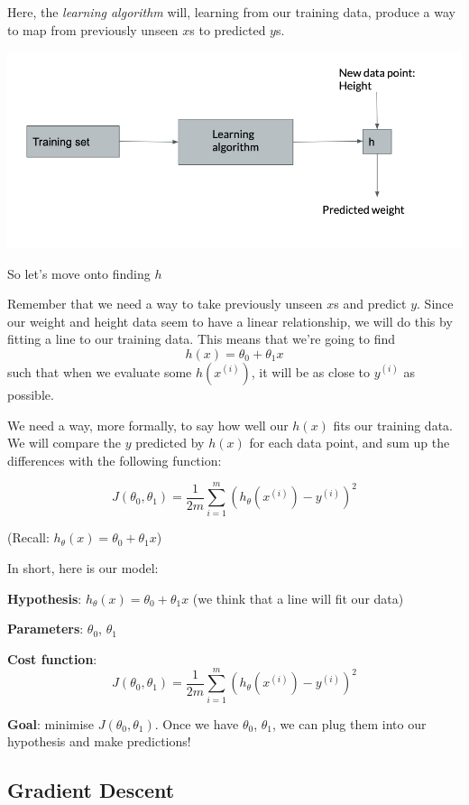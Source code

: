 \documentclass[12pt]{article}
\begin{document}
Here, the \textit{learning algorithm} will, learning from our training data, produce a way to map from previously unseen $x$s to predicted $y$s.


\includegraphics[width={\textwidth}]{the-model}


So let's move onto finding $h$

Remember that we need a way to take previously unseen $x$s and predict $y$. Since our weight and height data seem to have a linear relationship, we will do this by fitting a line to our training data. This means that we're going to find \[h(x) = \theta_0 + \theta_1x\] such that when we evaluate some $h(x^{(i)})$, it will be as close to $y^{(i)}$ as possible.

We need a way, more formally, to say how well our $h(x)$ fits our training data. We will compare the $y$ predicted by $h(x)$ for each data point, and sum up the differences with the following function:

\[J(\theta_0, \theta_1) = \frac{1}{2m} \sum^m_{i=1}(h_\theta(x^{(i)}) - y^{(i)})^2\]

(Recall: $h_\theta(x) = \theta_0 + \theta_1x$)

In short, here is our model:

\textbf{Hypothesis}: $h_\theta(x) = \theta_0 + \theta_1x$ (we think that a line will fit our data)

\textbf{Parameters}: $\theta_0$, $\theta_1$

\textbf{Cost function}: \[J(\theta_0, \theta_1) = \frac{1}{2m} \sum^m_{i=1}(h_\theta(x^{(i)}) - y^{(i)})^2\]

\textbf{Goal}: minimise $J(\theta_0, \theta_1)$. Once we have $\theta_0$, $\theta_1$, we can plug them into our hypothesis and make predictions!

\subsection{Gradient Descent}
\end{document}
